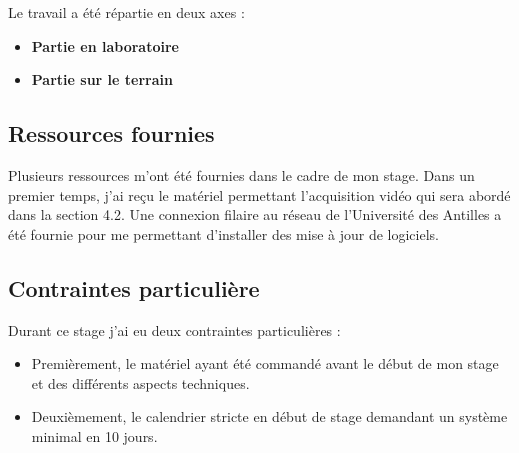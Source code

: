     \begin{flushleft}
        Le travail a été répartie en deux axes :
        \begin{itemize}
            \item  \textbf{Partie en laboratoire}
            \item  \textbf{Partie sur le terrain}
        \end{itemize}
        
        \vspace{0.5cm}      
    \end{flushleft}

    \subsection{Ressources fournies}
    Plusieurs ressources m'ont été fournies dans le cadre de mon stage.
    Dans un premier temps, j'ai reçu le matériel permettant l'acquisition vidéo qui sera abordé dans la section 4.2.
    Une connexion filaire au réseau de l'Université des Antilles a été fournie pour me permettant d'installer des mise à jour de logiciels.

    \subsection{Contraintes particulière}
    Durant ce stage j'ai eu deux contraintes particulières :
    \begin{itemize}
        \item  Premièrement, le matériel ayant été commandé avant le début de mon stage et des différents aspects techniques.
        \item  Deuxièmement, le calendrier stricte en début de stage demandant un système minimal en 10 jours.
    \end{itemize}